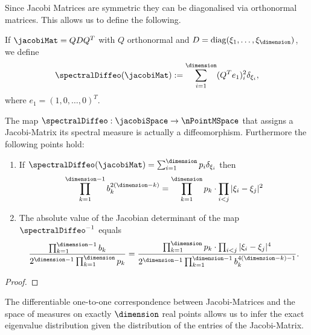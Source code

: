 Since Jacobi Matrices are symmetric they can be diagonalised via orthonormal matrices. This allows us to define the following.

\begin{definition}
    If $\jacobiMat = QDQ^T$ with $Q$ orthonormal and $D = \operatorname{diag}(\xi_1, \ldots, \xi_\dimension)$, we define
    \begin{align*}
        \spectralDiffeo(\jacobiMat) := \sum_{i=1}^{\dimension} (Q^T e_1)^2_i \delta_{\xi_i},
    \end{align*}
    where $e_1 = (1,0,\ldots,0)^T$.
\end{definition}

\begin{theorem}\label{thm: trafoTheorem}
    The map $\spectralDiffeo: \jacobiSpace \to \nPointMSpace$ that assigns a Jacobi-Matrix its spectral measure is actually a diffeomorphism. Furthermore the following points hold:
    \begin{enumerate}[label=(\alph*)]
        \item If $\spectralDiffeo(\jacobiMat) = \sum_{i=1}^\dimension p_i \delta_{\xi_i}$ then
        \begin{align}
            \prod_{k=1}^{\dimension-1} b_k^{2(\dimension-k)} = \prod_{k=1}^\dimension p_k \cdot \prod_{i<j} |\xi_i - \xi_j|^2
        \end{align}
        \item The absolute value of the Jacobian determinant of the map $\spectralDiffeo^{-1}$ equals
        \begin{align}\label{inverseSpectralDet}
            \frac{\prod_{k=1}^{\dimension-1} b_k}{2^{\dimension-1} \prod_{k=1}^\dimension p_k} 
            = \frac{\prod_{k=1}^\dimension p_k \cdot \prod_{i<j} |\xi_i - \xi_j|^4}{2^{\dimension-1} \prod_{k=1}^{\dimension-1} b_k^{4(\dimension - k)-1}}.
        \end{align}
    \end{enumerate}
\end{theorem}
\begin{proof}
\end{proof}

The differentiable one-to-one correspondence between Jacobi-Matrices and the space of measures on exactly $\dimension$ real points allows us to infer the exact eigenvalue distribution given the distribution of the entries of the Jacobi-Matrix.

